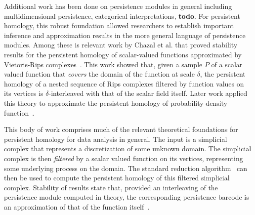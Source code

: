 Additional work has been done on persistence modules in general including multidimensional persistence, categorical interpretations, \textbf{todo}.
For persistent homology, this robust foundation allowed researchers to establish important inference and approximation results in the more general language of persistence modules.
Among these is relevant work by Chazal et al. that proved stability results for the persistent homology of scalar-valued functions approximated by Vietoris-Rips complexes~\cite{chazal09analysis}.
This work showed that, given a sample $P$ of a scalar valued function that \emph{covers} the domain of the function at scale $\delta$, the persistent homology of a nested sequence of Rips complexes filtered by function values on its vertices is $\delta$-interleaved with that of the scalar field itself.
Later work applied this theory to approximate the persistent homology of probability density function~\cite{chazal2013persistence}.

This body of work comprises much of the relevant theoretical foundations for persistent homology for data analysis in general.
The input is a simplicial complex that represents a discretization of some unknown domain.
The simplicial complex is then \emph{filtered} by a scalar valued function on its vertices, representing some underlying process on the domain.
The standard reduction algorithm~\cite{edelsbrunner02simplification,zomorodian05computing} can then be used to compute the persistent homology of this filtered simplicial complex.
Stability of results state that, provided an interleaving of the persistence module computed in theory, the corresponding persistence barcode is an approximation of that of the function itself~\cite{cohensteiner07stability,chazal09proximity}.

